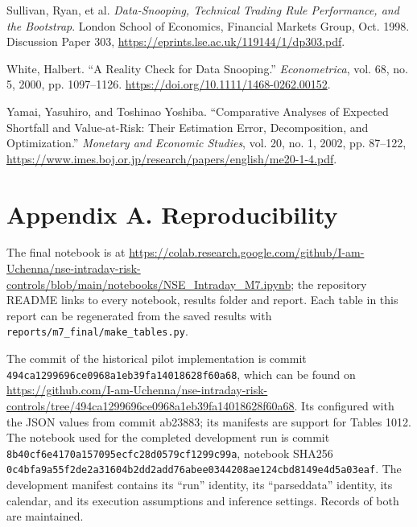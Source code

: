 \documentclass[11pt,a4paper]{article}
\begin{document}
{\RaggedRight\hangindent=1.27cm\noindent Sullivan, Ryan, et al. \textit{Data-Snooping, Technical Trading Rule Performance, and the Bootstrap}. London School of Economics, Financial Markets Group, Oct. 1998. Discussion Paper 303, \url{https://eprints.lse.ac.uk/119144/1/dp303.pdf}.\par}\vspace{5pt}

{\RaggedRight\hangindent=1.27cm\noindent White, Halbert. “A Reality Check for Data Snooping.” \textit{Econometrica}, vol. 68, no. 5, 2000, pp. 1097–1126. \url{https://doi.org/10.1111/1468-0262.00152}.\par}\vspace{5pt}

{\RaggedRight\hangindent=1.27cm\noindent Yamai, Yasuhiro, and Toshinao Yoshiba. “Comparative Analyses of Expected Shortfall and Value-at-Risk: Their Estimation Error, Decomposition, and Optimization.” \textit{Monetary and Economic Studies}, vol. 20, no. 1, 2002, pp. 87--122, \url{https://www.imes.boj.or.jp/research/papers/english/me20-1-4.pdf}.\par}\vspace{5pt}

\clearpage
\section*{Appendix A. Reproducibility}

The final notebook is at \url{https://colab.research.google.com/github/I-am-Uchenna/nse-intraday-risk-controls/blob/main/notebooks/NSE_Intraday_M7.ipynb}; the repository README links to every notebook, results folder and report. Each table in this report can be regenerated from the saved results with \nolinkurl{reports/m7_final/make_tables.py}.

The commit of the historical pilot implementation is commit \nolinkurl{494ca1299696ce0968a1eb39fa14018628f60a68}, which can be found on \url{https://github.com/I-am-Uchenna/nse-intraday-risk-controls/tree/494ca1299696ce0968a1eb39fa14018628f60a68}. Its configured with the JSON values from commit ab23883; its manifests are support for Tables 10\allowbreak{}12. The notebook used for the completed development run is commit \nolinkurl{8b40cf6e4170a157095ecfc28d0579cf1299c99a}, notebook SHA\allowbreak{}256 \nolinkurl{0c4bfa9a55f2de2a31604b2dd2add76abee0344208ae124cbd8149e4d5a03eaf}. The development manifest contains its “run” identity, its “parsed\allowbreak{}data” identity, its calendar, and its execution assumptions and inference settings. Records of both are maintained.
\end{document}
